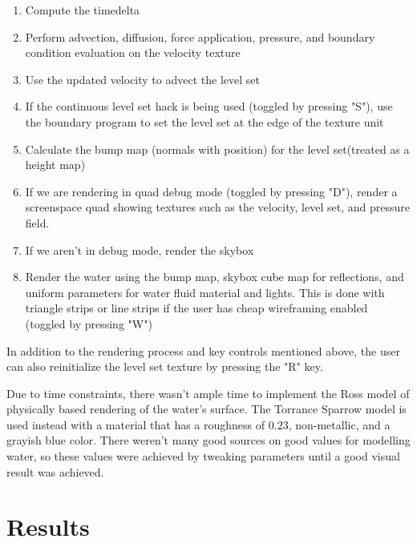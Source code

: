 \documentclass[conference]{IEEEtran}
\begin{document}
\begin{enumerate}
	\item Compute the timedelta

	\item Perform advection, diffusion, force application, pressure, and boundary condition evaluation on the velocity texture

	\item Use the updated velocity to advect the level set

	\item If the continuous level set hack is being used (toggled by pressing "S"), use the boundary program to set the level set at the edge of the texture unit

	\item Calculate the bump map (normals with position) for the level set(treated as a height map)

	\item If we are rendering in quad debug mode (toggled by pressing "D"), render a screenspace quad showing textures such as the velocity, level set, and pressure field.

	\item If we aren't in debug mode, render the skybox

	\item Render the water using the bump map, skybox cube map for reflections, and uniform parameters for water fluid material and lights. This is done with triangle strips or line strips if the user has cheap wireframing enabled (toggled by pressing "W")

\end{enumerate}

In addition to the rendering process and key controls mentioned above, the user can also reinitialize the level set texture by pressing the "R" key.

Due to time constraints, there wasn't ample time to implement the Ross model of physically based rendering of the water's surface. The Torrance Sparrow model is used instead with a material that has a roughness of $0.23$, non-metallic, and a grayish blue color. There weren't many good sources on good values for modelling water, so these values were achieved by tweaking parameters until a good visual result was achieved. 



\section{Results}
\end{document}
